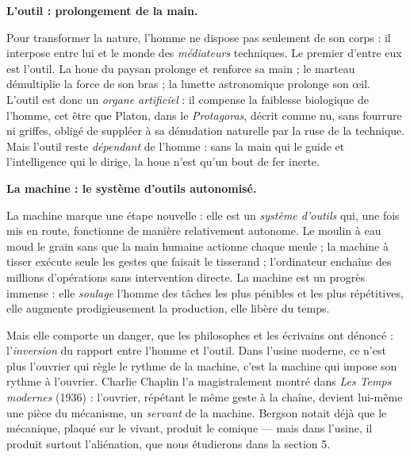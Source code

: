 \documentclass[11pt]{article}
\newcommand{\cle}[1]{{\popxbold\color{popdark}#1}}
\begin{document}
\textbf{L'outil : prolongement de la main.}\par
Pour transformer la nature, l'homme ne dispose pas seulement de son corps : il interpose entre lui et le monde des \emph{médiateurs} techniques. Le premier d'entre eux est l'\cle{outil}. La houe du paysan prolonge et renforce sa main ; le marteau démultiplie la force de son bras ; la lunette astronomique prolonge son œil. L'outil est donc un \emph{organe artificiel} : il compense la faiblesse biologique de l'homme, cet être que Platon, dans le \emph{Protagoras}, décrit comme nu, sans fourrure ni griffes, obligé de suppléer à sa dénudation naturelle par la ruse de la technique. Mais l'outil reste \emph{dépendant} de l'homme : sans la main qui le guide et l'intelligence qui le dirige, la houe n'est qu'un bout de fer inerte.

\textbf{La machine : le système d'outils autonomisé.}\par
La \cle{machine} marque une étape nouvelle : elle est un \emph{système d'outils} qui, une fois mis en route, fonctionne de manière relativement autonome. Le moulin à eau moud le grain sans que la main humaine actionne chaque meule ; la machine à tisser exécute seule les gestes que faisait le tisserand ; l'ordinateur enchaîne des millions d'opérations sans intervention directe. La machine est un progrès immense : elle \emph{soulage} l'homme des tâches les plus pénibles et les plus répétitives, elle augmente prodigieusement la production, elle libère du temps.

Mais elle comporte un danger, que les philosophes et les écrivains ont dénoncé : l'\emph{inversion} du rapport entre l'homme et l'outil. Dans l'usine moderne, ce n'est plus l'ouvrier qui règle le rythme de la machine, c'est la machine qui impose son rythme à l'ouvrier. Charlie Chaplin l'a magistralement montré dans \emph{Les Temps modernes} (1936) : l'ouvrier, répétant le même geste à la chaîne, devient lui-même une pièce du mécanisme, un \emph{servant} de la machine. Bergson notait déjà que le mécanique, plaqué sur le vivant, produit le comique — mais dans l'usine, il produit surtout l'aliénation, que nous étudierons dans la section 5.
\end{document}
